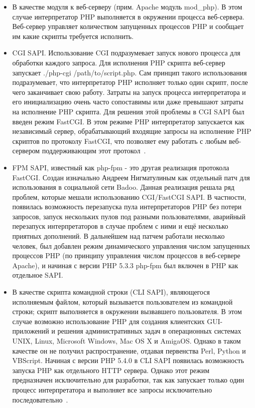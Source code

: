 \begin{itemize}
    \item   В качестве модуля к веб-серверу (прим. Apache модуль mod\_php). В этом случае интерпретатор PHP выполняется в окружении процесса веб-сервера. Веб-сервер управляет количеством запущенных процессов PHP и сообщает им какие скрипты требуется исполнить.

    \item   CGI SAPI. Использование CGI подразумевает запуск нового процесса для обработки каждого запроса. Для исполнения PHP скрипта веб-сервер запускает ./php-cgi /path/to/script.php. Сам принцип такого использования подразумевает, что интерпретатор PHP исполняет только один скрипт, после чего заканчивает свою работу. Затраты на запуск процесса интерпретатора и его инициализацию очень часто сопоставимы или даже превышают затраты на исполнение PHP скрипта. Для решения этой проблемы в CGI SAPI был введен режим FastCGI. В этом режиме PHP интерпретатор запускается как независимый сервер, обрабатывающий входящие запросы на исполнение PHP скриптов по протоколу FastCGI, что позволяет ему работать с любым веб-сервером поддерживающим этот протокол~\cite{php_documents}.

    \item   FPM SAPI, известный как php-fpm - это другая реализация протокола FastCGI. Создан изначально Андреем Нигматулиным как отдельный патч для использования в социальной сети Badoo. Данная реализация решала ряд проблем, которые мешали использованию CGI/FastCGI SAPI. В частности, появилась возможность перезапуска пула интерпретаторов PHP без потери запросов, запуск нескольких пулов под разными пользователями, аварийный перезапуск интерпретаторов в случае проблем с ними и ещё несколько приятных дополнений. В дальнейшем над патчем работали несколько человек, был добавлен режим динамического управления числом запущенных процессов PHP (по принципу управления числом процессов в веб-сервере Apache), и начиная с версии PHP 5.3.3 php-fpm был включен в PHP как отдельное SAPI.

    \item   В качестве скрипта командной строки (CLI SAPI), являющегося исполняемым файлом, который вызывается пользователем из командной строки; скрипт выполняется в окружении вызвавшего пользователя. В этом случае возможно использование PHP для создания клиентских GUI-приложений и решения административных задач в операционных системах UNIX, Linux, Microsoft Windows, Mac OS X и AmigaOS. Однако в таком качестве он не получил распространение, отдавая первенства Perl, Python и VBScript.
    Начиная с версии PHP 5.4.0 в CLI SAPI появилась возможность запуска PHP как отдельного HTTP сервера. Однако этот режим предназначен исключительно для разработки, так как запускает только один процесс интерпретатора и выполняет все запросы исключительно последовательно~\cite{php_documents}.
\end{itemize}


